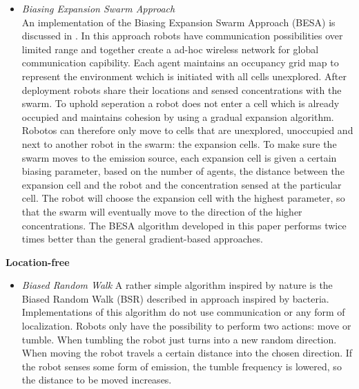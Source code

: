 \begin{itemize}
		\item
		\textit{Biasing Expansion Swarm Approach}\\
		An implementation of the Biasing Expansion Swarm Approach (BESA) is discussed in \cite{cui2004swarm}.
		In this approach robots have communication possibilities over limited range and together create a ad-hoc wireless network for global communication capibility.
		Each agent maintains an occupancy grid map to represent the environment wchich is initiated with all cells unexplored.
		After deployment robots share their locations and sensed concentrations with the swarm.
		To uphold seperation a robot does not enter a cell which is already occupied and maintains cohesion by using a gradual expansion algorithm.
		Robotos can therefore only move to cells that are unexplored, unoccupied and next to another robot in the swarm: the expansion cells.
		To make sure the swarm moves to the emission source, each expansion cell is given a certain biasing parameter, based on the number of agents, the distance between the expansion cell and the robot and the concentration sensed at the particular cell.
		The robot will choose the expansion cell with the highest parameter, so that the swarm will eventually move to the direction of the higher concentrations.
		The BESA algorithm developed in this paper performs twice times better than the general gradient-based approaches.

	\end{itemize}

	\textbf{Location-free}
	\begin{itemize}
		\item
		\textit{Biased Random Walk}
		A rather simple algorithm inspired by nature is the Biased Random Walk (BSR) described in \cite{dhariwal2004bacterium} approach inspired by bacteria. 
		Implementations of this algorithm do not use communication or any form of localization. 
		Robots only have the possibility to perform two actions: move or tumble. 
		When tumbling the robot just turns into a new random direction. 
		When moving the robot travels a certain distance into the chosen direction. 
		If the robot senses some form of emission, the tumble frequency is lowered, so the distance to be moved increases.
	\end{itemize}


